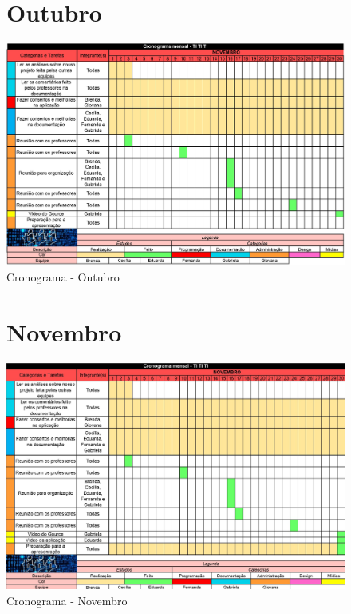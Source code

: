 \begin{apendicesenv}
\begin{figure}[!htbp]
\begin{flushleft}
    \section{Outubro}
\end{flushleft}
    \centering
    \caption{\label{cronograma-out}Cronograma - Outubro}
    \includegraphics[scale=0.5,angle=90]{imagens/CronogramaOUTUBRO.png}
\end{figure}

\begin{figure}[!htbp]
\begin{flushleft}
    \section{Novembro}
\end{flushleft}
    \centering
    \caption{\label{cronograma-nov}Cronograma - Novembro}
    \includegraphics[scale=0.75,angle=90]{imagens/CronogramaNOVEMBRO.jpg}
\end{figure}


\end{apendicesenv}
